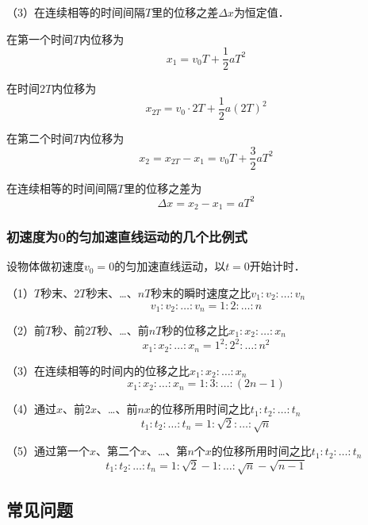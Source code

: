 （3）在连续相等的时间间隔$T$里的位移之差$\Delta x$为恒定值．

在第一个时间$T$内位移为
\begin{equation}
x_1=v_0T+\frac12aT^2
\end{equation}

在时间$2T$内位移为
\begin{equation}
x_{2T}=v_0\cdot2T+\frac12a(2T)^2
\end{equation}

在第二个时间$T$内位移为
\begin{equation}
x_2=x_{2T}-x_1=v_0T+\frac32aT^2
\end{equation}

在连续相等的时间间隔$T$里的位移之差为
\begin{equation}
\Delta x=x_2-x_1=aT^2
\end{equation}

\subsubsection{初速度为0的匀加速直线运动的几个比例式}
设物体做初速度$v_0=0$的匀加速直线运动，以$t=0$开始计时．

（1）$T$秒末、$2T$秒末、…、$nT$秒末的瞬时速度之比$v_1:v_2:\dots:v_n$
\begin{equation}
v_1:v_2:\dots:v_n=1:2:\dots:n
\end{equation}

（2）前$T$秒、前$2T$秒、…、前$nT$秒的位移之比$x_1:x_2:\dots:x_n$
\begin{equation}
x_1:x_2:\dots:x_n=1^2:2^2:\dots:n^2
\end{equation}

（3）在连续相等的时间内的位移之比$x_1:x_2:\dots:x_n$
\begin{equation}
x_1:x_2:\dots:x_n=1:3:\dots:(2n-1)
\end{equation}

（4）通过$x$、前$2x$、…、前$nx$的位移所用时间之比$t_1:t_2:\dots:t_n$
\begin{equation}
t_1:t_2:\dots:t_n=1:\sqrt{2}:\dots:\sqrt{n}
\end{equation}

（5）通过第一个$x$、第二个$x$、…、第$n$个$x$的位移所用时间之比$t_1:t_2:\dots:t_n$
\begin{equation}
t_1:t_2:\dots:t_n=1:\sqrt{2}-1:\dots:\sqrt{n}-\sqrt{n-1}
\end{equation}

\subsection{常见问题}
